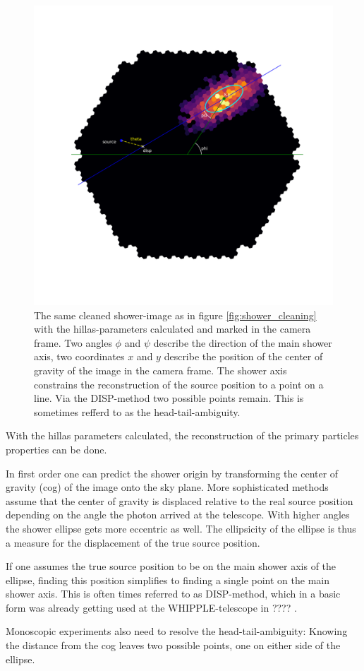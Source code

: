 \begin{figure}
	\centering
	\includegraphics[width=.5\textwidth]{Plots/hillas_complete.pdf}
	\caption{The same cleaned shower-image as in figure \ref{fig:shower_cleaning}
	with the hillas-parameters calculated and marked in the camera frame.
	Two angles $\phi$ and $\psi$ describe the direction of the 
	main shower axis, two coordinates $x$ and $y$ describe the position of 
	the center of gravity of the image in the camera frame.
	The shower axis constrains the reconstruction of the source position to a 
	point on a line. Via the DISP-method two possible points remain.
	This is sometimes refferd to as the head-tail-ambiguity.
	}
	\label{fig:hillas_params}
\end{figure}

With the hillas parameters calculated, the reconstruction of the 
primary particles properties can be done.

In first order one can predict the shower origin by 
transforming the center of gravity (cog) of the image onto the sky plane.
More sophisticated methods assume that the 
center of gravity is displaced relative to the
real source position depending on the angle the photon arrived at the telescope.
With higher angles the shower ellipse gets more eccentric as well.
The ellipsicity of the ellipse is thus a measure for the displacement of the true 
source position.

If one assumes the true source position to be on the main shower axis of the ellipse,
finding this position simplifies to finding a single point on the main shower axis.
This is often times referred to as DISP-method,
which in a basic form was already getting used at 
the WHIPPLE-telescope in ???? \cite{???}.

Monoscopic experiments also need to resolve the head-tail-ambiguity:
Knowing the distance from the cog leaves two possible points, one on either side 
of the ellipse.

